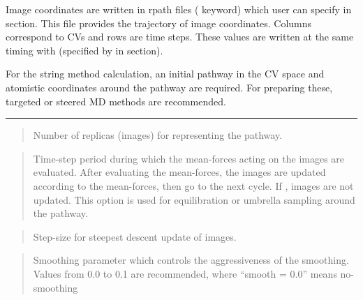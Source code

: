 \documentclass[a4paper,11pt,oneside,english]{sphinxmanual}
\begin{document}
Image coordinates are written in rpath files ( keyword)
which user can specify in \sphinxstylestrong{{[}OUTPUT{]}} section.
This file provides the trajectory of image coordinates.
Columns correspond to CVs and rows are time steps.
These values are written at the same timing with 
(specified by  in \sphinxstylestrong{{[}DYNAMICS{]}} section).

For the string method calculation, an initial pathway in the CV space
and atomistic coordinates around the pathway are required. For preparing these,
targeted or steered MD methods are recommended.


\bigskip\hrule\bigskip


 
\begin{quote}


Number of replicas (images) for representing the pathway.
\end{quote}

 
\begin{quote}


Time-step period during which the mean-forces acting on the
images are evaluated. After evaluating the mean-forces,
the images are updated according to the mean-forces, then go to the
next cycle. If , images are not updated. This
option is used for equilibration or umbrella sampling around the
pathway.
\end{quote}

 
\begin{quote}


Step-size for steepest descent update of images.
\end{quote}

 
\begin{quote}


Smoothing parameter which controls the aggressiveness of the smoothing.
Values from 0.0 to 0.1 are recommended,
where “smooth = 0.0” means no-smoothing
\end{quote}
\end{document}
